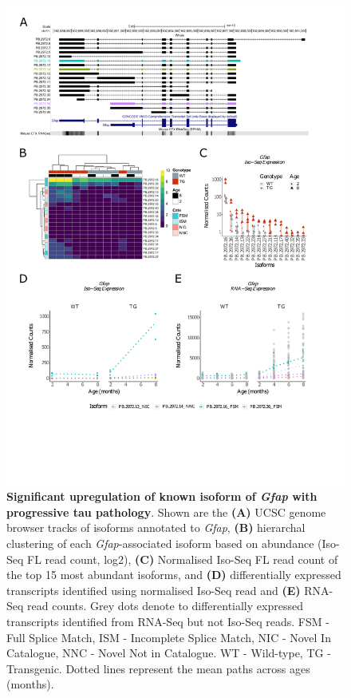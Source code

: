 \begin{figure}[!htp]
	\centering
	\includegraphics[page=1,trim={0.5cm 4.8cm 2cm 1cm}, scale = 0.85]{Figures/Ch5_DiffPlots.pdf}
	\captionsetup{width=0.95\textwidth}
	\caption[Differential Isoform Expression: Changes in transcript expression of isoforms associated with \textit{Gfap}]%
	{\textbf{Significant upregulation of known isoform of \textit{Gfap} with progressive tau pathology}. Shown are the \textbf{(A)} UCSC genome browser tracks of isoforms annotated to \textit{Gfap}, \textbf{(B)} hierarchal clustering of each \textit{Gfap}-associated isoform based on abundance (Iso-Seq FL read count, log2), \textbf{(C)} Normalised Iso-Seq FL read count of the top 15 most abundant isoforms, and \textbf{(D)} differentially expressed transcripts identified using normalised Iso-Seq read and \textbf{(E)} RNA-Seq read counts. Grey dots denote to differentially expressed transcripts identified from RNA-Seq but not Iso-Seq reads. FSM - Full Splice Match, ISM - Incomplete Splice Match, NIC - Novel In Catalogue, NNC - Novel Not in Catalogue. WT - Wild-type, TG - Transgenic. Dotted lines represent the mean paths across ages (months).} 
	\label{fig:DEI_gfap}
\end{figure}


